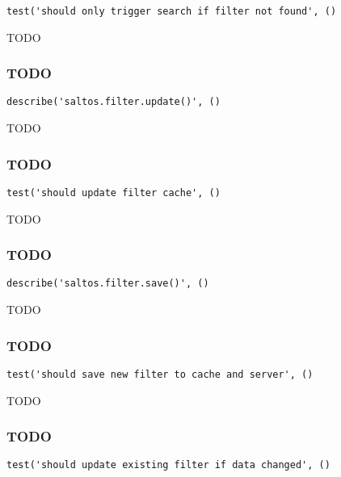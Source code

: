 \documentclass[a4paper]{article}
\begin{document}
\begin{lstlisting}
test('should only trigger search if filter not found', ()
\end{lstlisting}

TODO

\hypertarget{toc595}{}
\subsubsection{TODO}

\begin{lstlisting}
describe('saltos.filter.update()', ()
\end{lstlisting}

TODO

\hypertarget{toc596}{}
\subsubsection{TODO}

\begin{lstlisting}
test('should update filter cache', ()
\end{lstlisting}

TODO

\hypertarget{toc597}{}
\subsubsection{TODO}

\begin{lstlisting}
describe('saltos.filter.save()', ()
\end{lstlisting}

TODO

\hypertarget{toc598}{}
\subsubsection{TODO}

\begin{lstlisting}
test('should save new filter to cache and server', ()
\end{lstlisting}

TODO

\hypertarget{toc599}{}
\subsubsection{TODO}

\begin{lstlisting}
test('should update existing filter if data changed', ()
\end{lstlisting}
\end{document}
